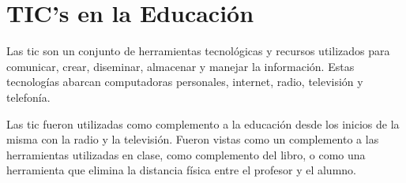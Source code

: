 \chapter{TIC's en la Educación}
\label{chap:tics}

Las \Gls{tic} son un conjunto de herramientas tecnológicas y recursos utilizados
para comunicar, crear, diseminar, almacenar y manejar la
información\cite{unesco:ict}. Estas tecnologías abarcan computadoras personales,
internet, radio, televisión y telefonía\cite{tinio:ict}.

Las \Gls{tic} fueron utilizadas como complemento a la educación desde los
inicios de la misma con la radio y la televisión. Fueron vistas como un
complemento a las herramientas utilizadas en clase, como complemento del libro,
o como una herramienta que elimina la distancia física entre el profesor y el
alumno\cite{unesco:ict}. 












